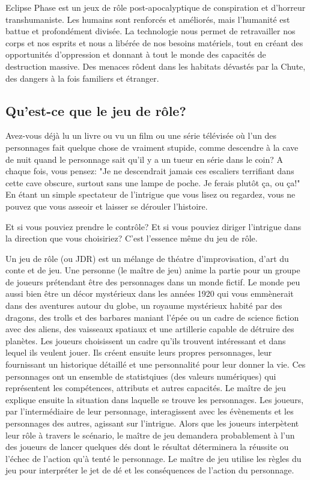 Eclipse Phase est un jeux de rôle post-apocalyptique de conspiration et d'horreur transhumaniste. Les humains sont renforcés et améliorés, mais l'humanité est battue et profondément divisée. La technologie nous permet de retravailler nos corps et nos esprits et nous a libérée de nos besoins matériels, tout en créant des opportunités d'oppression et donnant à tout le monde des capacités de destruction massive. Des menaces rôdent dans les habitats dévastés par la Chute, des dangers à la fois familiers et étranger. 



\subsection{Qu'est-ce que le jeu de rôle?} \label{sec:what-roleplaying} 

Avez-vous déjà lu un livre ou vu un film ou une série télévisée où l'un des personnages fait quelque chose de vraiment stupide, comme descendre à la cave de nuit quand le personnage sait qu'il y a un tueur en série dans le coin? A chaque fois, vous pensez: "Je ne descendrait jamais ces escaliers terrifiant dans cette cave obscure, surtout sans une lampe de poche. Je ferais plutôt ça, ou ça!" En étant un simple spectateur de l'intrigue que vous lisez ou regardez, vous ne pouvez que vous asseoir et laisser se dérouler l'histoire. 

Et si vous pouviez prendre le contrôle? Et si vous pouviez diriger l'intrigue dans la direction que vous choisiriez? C'est l'essence même du jeu de rôle. 

Un jeu de rôle (ou JDR) est un mélange de théatre d'improvisation, d'art du conte et de jeu. Une personne (le maître de jeu) anime la partie pour un groupe de joueurs prétendant être des personnages dans un monde fictif. Le monde peu aussi bien être un décor mystérieux dans les années 1920 qui vous emmènerait dans des aventures autour du globe, un royaume mystérieux habité par des dragons, des trolls et des barbares maniant l'épée ou un cadre de science fiction avec des aliens, des vaisseaux spatiaux et une artillerie capable de détruire des planètes. Les joueurs choisissent un cadre qu'ils trouvent intéressant et dans lequel ils veulent jouer. Ils créent ensuite leurs propres personnages, leur fournissant un historique détaillé et une personnalité pour leur donner la vie. Ces personnages ont un ensemble de statistqiues (des valeurs numériques) qui représentent les compétences, attributs et autres capacités. Le maître de jeu explique ensuite la situation dans laquelle se trouve les personnages. Les joueurs, par l'intermédiaire de leur personnage, interagissent avec les évènements et les personnages des autres, agissant sur l'intrigue. Alors que les joueurs interpètent leur rôle à travers le scénario, le maître de jeu demandera probablement à l'un des joueurs de lancer quelques dés dont le résultat déterminera la réussite ou l'échec de l'action qu'à tenté le personnage. Le maître de jeu utilise les règles du jeu pour interpréter le jet de dé et les conséquences de l'action du personnage. 

